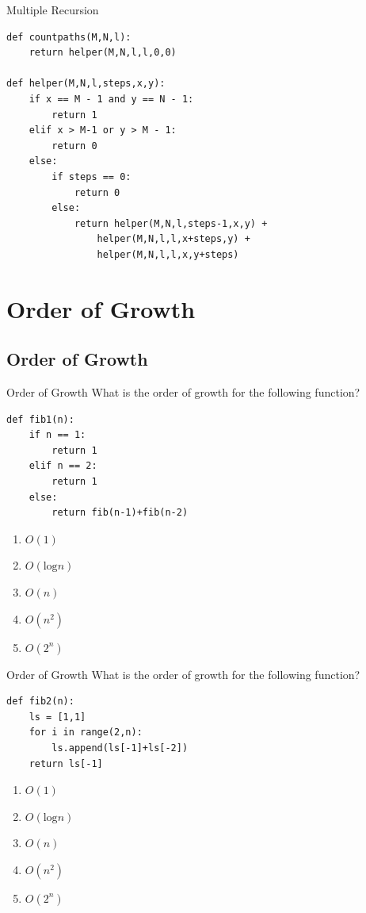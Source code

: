\documentclass[9pt]{beamer}
\begin{document}
\begin{frame}[fragile]{Multiple Recursion}

  \begin{lstlisting}
def countpaths(M,N,l):
    return helper(M,N,l,l,0,0)

def helper(M,N,l,steps,x,y):
    if x == M - 1 and y == N - 1:
        return 1
    elif x > M-1 or y > M - 1:
        return 0
    else:
        if steps == 0:
            return 0
        else:
            return helper(M,N,l,steps-1,x,y) +
                helper(M,N,l,l,x+steps,y) +
                helper(M,N,l,l,x,y+steps)
  \end{lstlisting}
\end{frame}

\section{Order of Growth}
\subsection{Order of Growth}
\begin{frame}[fragile]{Order of Growth}
  What is the order of growth for the following function?

  \begin{lstlisting}
def fib1(n):
    if n == 1:
        return 1
    elif n == 2:
        return 1
    else:
        return fib(n-1)+fib(n-2)
  \end{lstlisting}

  \begin{enumerate}
    \item
      $O(1)$
    \item
      $O(\text{log}n)$
    \item
      $O(n)$
    \item
      $O(n^2)$
    \item
      \alert<2>{$O(2^n)$}
  \end{enumerate}
\end{frame}

\begin{frame}[fragile]{Order of Growth}
  What is the order of growth for the following function?

  \begin{lstlisting}
def fib2(n):
    ls = [1,1]
    for i in range(2,n):
        ls.append(ls[-1]+ls[-2])
    return ls[-1]
  \end{lstlisting}

  \begin{enumerate}
    \item
      $O(1)$
    \item
      $O(\text{log}n)$
    \item
      \alert<2>{$O(n)$}
    \item
      $O(n^2)$
    \item
      $O(2^n)$
  \end{enumerate}
\end{frame}
\end{document}
